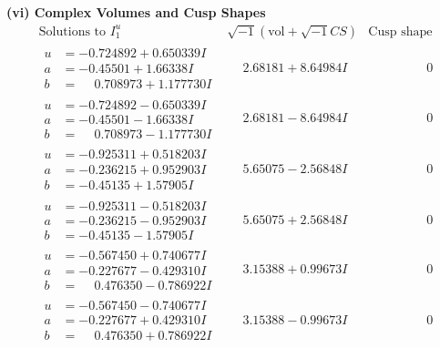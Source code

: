\documentclass[1p]{elsarticle_modified}
\theoremstyle{definition}
\newcommand{\I}{\sqrt{-1}}
\begin{document}
\newpage\flushleft \textbf{(vi) Complex Volumes and Cusp Shapes}
$$\begin{array}{c|c|c}  
\text{Solutions to }I^u_{1}& \I (\text{vol} + \sqrt{-1}CS) & \text{Cusp shape}\\
 \hline 
\begin{aligned}
u &= -0.724892 + 0.650339 I \\
a &= -0.45501 + 1.66338 I \\
b &= \phantom{-}0.708973 + 1.177730 I\end{aligned}
 & \phantom{-}2.68181 + 8.64984 I & \phantom{-0.000000 } 0 \\ \hline\begin{aligned}
u &= -0.724892 - 0.650339 I \\
a &= -0.45501 - 1.66338 I \\
b &= \phantom{-}0.708973 - 1.177730 I\end{aligned}
 & \phantom{-}2.68181 - 8.64984 I & \phantom{-0.000000 } 0 \\ \hline\begin{aligned}
u &= -0.925311 + 0.518203 I \\
a &= -0.236215 + 0.952903 I \\
b &= -0.45135 + 1.57905 I\end{aligned}
 & \phantom{-}5.65075 - 2.56848 I & \phantom{-0.000000 } 0 \\ \hline\begin{aligned}
u &= -0.925311 - 0.518203 I \\
a &= -0.236215 - 0.952903 I \\
b &= -0.45135 - 1.57905 I\end{aligned}
 & \phantom{-}5.65075 + 2.56848 I & \phantom{-0.000000 } 0 \\ \hline\begin{aligned}
u &= -0.567450 + 0.740677 I \\
a &= -0.227677 - 0.429310 I \\
b &= \phantom{-}0.476350 - 0.786922 I\end{aligned}
 & \phantom{-}3.15388 + 0.99673 I & \phantom{-0.000000 } 0 \\ \hline\begin{aligned}
u &= -0.567450 - 0.740677 I \\
a &= -0.227677 + 0.429310 I \\
b &= \phantom{-}0.476350 + 0.786922 I\end{aligned}
 & \phantom{-}3.15388 - 0.99673 I & \phantom{-0.000000 } 0 \\ \hline\begin{aligned}

\end{aligned}
\end{array}$$
\end{document}
